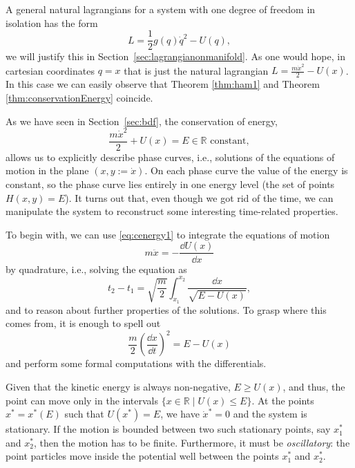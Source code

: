 \documentclass[english,fontsize=11pt,paper=b5]{scrbook}
\theoremstyle{definition}
\begin{document}
    A general natural lagrangians for a system with one degree of freedom in isolation has the form
    \begin{equation}
      L = \frac12 g(q)\dot q^2 - U(q),
    \end{equation}
    we will justify this in Section~\ref{sec:lagrangianonmanifold}.
    As one would hope, in cartesian coordinates $q = x$ that is just the natural lagrangian $L = \frac{m \dot x^2}{2} - U(x)$.
    In this case we can easily observe that Theorem \ref{thm:ham1} and Theorem \ref{thm:conservationEnergy} coincide.

    As we have seen in Section~\ref{sec:bdf}, the conservation of energy,
    \begin{equation}\label{eq:cenergy1}
      \frac{m \dot x^2}{2} + U(x) = E \in\mathbb{R} \mbox{ constant},
    \end{equation}
    allows us to explicitly describe phase curves, i.e., solutions of the equations of motion in the plane $(x, y := \dot x)$.
    On each phase curve the value of the energy is constant, so the phase curve lies entirely in one energy level (the set of points $H(x,y)=E$). It turns out that, even though we got rid of the time, we can manipulate the system to reconstruct some interesting time-related properties.

    To begin with, we can use \eqref{eq:cenergy1} to integrate the equations of motion
    \begin{equation}
      m \ddot x = - \frac{\dd U(x)}{\dd x}
    \end{equation}
    by quadrature, i.e., solving the equation as
    \begin{equation}
      t_2 - t_1 = \sqrt{\frac m2} \int_{x_1}^{x_2} \frac{\dd x}{\sqrt{E-U(x)}},
    \end{equation}
    and to reason about further properties of the solutions.
    To grasp where this comes from, it is enough to spell out
    \begin{equation}
      \frac m2 \left(\frac{\dd x}{\dd t}\right)^2 = E - U(x) 
    \end{equation}
    and perform some formal computations with the differentials.

    Given that the kinetic energy is always non-negative, $E \geq U(x)$, and thus, the point can move only in the intervals $\{ x\in\mathbb{R} \mid U(x) \leq E\}$. At the points $x^* = x^*(E)$ such that $U(x^*) = E$, we have $\dot x^* = 0$ and the system is stationary. If the motion is bounded between two such stationary points, say $x_1^*$ and $x_2^*$, then the motion has to be finite.
    Furthermore, it must be \emph{oscillatory}: the point particles move inside the potential well between the points $x_1^*$ and $x_2^*$.
\end{document}
